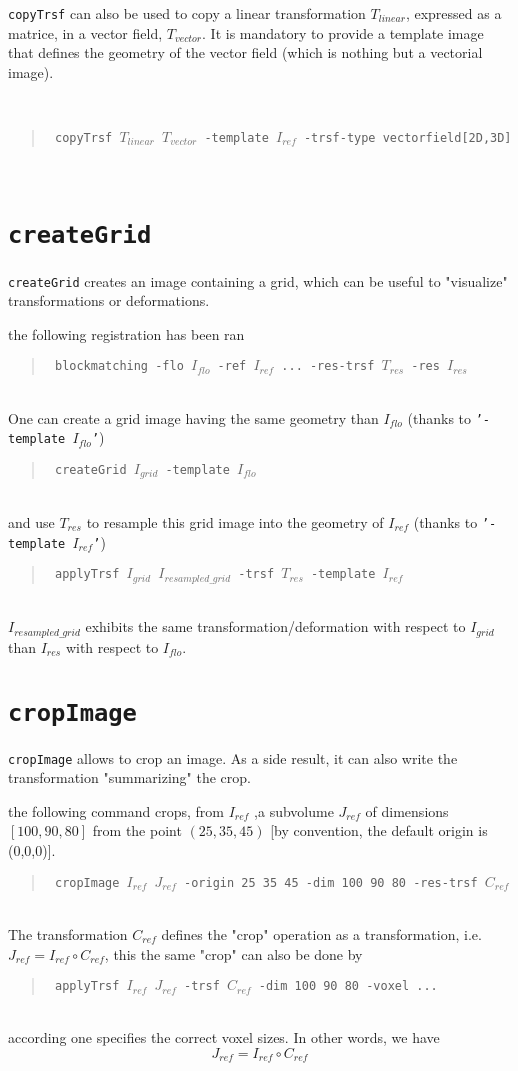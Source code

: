 \documentclass[10pt]{report}
\def\applyTrsf{\texttt{applyTrsf} }
\def\blockmatching{\texttt{blockmatching} }
\def\copyTrsf{\texttt{copyTrsf} }
\def\createGrid{\texttt{createGrid} }
\def\cropImage{\texttt{cropImage} }
\newcommand{\option}[1]{{\texttt{'#1'}}}
\newenvironment{code}[1]{\mbox{}\\[1ex]\hspace*{-#1cm}\begin{minipage}{150mm}\begin{quote}\tt}{\end{quote}\end{minipage}\mbox{}\\[1ex]}
\begin{document}
\copyTrsf can also be used to copy a linear transformation $T_{linear}$, expressed as a matrice, in a vector field, $T_{vector}$. It is mandatory to provide a template image that defines the geometry of the vector field (which is nothing but a vectorial image).

\begin{code}{0.8}
\% \copyTrsf $T_{linear}$ $T_{vector}$  -template $I_{ref}$ -trsf-type vectorfield[2D,3D]
\end{code}






\section{\createGrid}

\createGrid creates an image containing a grid, which can be useful to "visualize" transformations or deformations.


 the following registration has been ran
\begin{code}{1}
\% \blockmatching -flo $I_{flo}$ -ref $I_{ref}$ ... -res-trsf $T_{res}$ -res $I_{res}$
\end{code}
One can create a grid image having the same geometry than $I_{flo}$ (thanks to \option{-template $I_{flo}$})
\begin{code}{1}
\% \createGrid $I_{grid}$ -template $I_{flo}$ 
\end{code}
and use $T_{res}$ to resample this grid image into the geometry of $I_{ref}$ (thanks to \option{-template $I_{ref}$})
\begin{code}{1}
\% \applyTrsf $I_{grid}$ $I_{resampled\_grid}$ -trsf $T_{res}$ -template $I_{ref}$ 
\end{code}
$I_{resampled\_grid}$ exhibits the same transformation/deformation with respect to $I_{grid}$ than 
$I_{res}$ with respect to $I_{flo}$.





\section{\cropImage}

\cropImage allows to crop an image. As a side result, it can also write the transformation "summarizing" the crop.

the following command crops, from $I_{ref}$ ,a subvolume $J_{ref}$ of dimensions $[100,90,80]$ from the point $(25, 35, 45)$ [by convention, the default origin is (0,0,0)].
\begin{code}{0.8}
\% \cropImage $I_{ref}$ $J_{ref}$ -origin 25 35 45 -dim 100 90 80 -res-trsf $C_{ref}$
\end{code}
The transformation $C_{ref}$ defines the "crop" operation as a transformation,
i.e. $J_{ref} = I_{ref} \circ C_{ref}$, this the same "crop" can also be done by 
\begin{code}{0.8}
\% \applyTrsf $I_{ref}$ $J_{ref}$ -trsf $C_{ref}$ -dim 100 90 80 -voxel ...
\end{code}
according one specifies the correct voxel sizes. In other words, we have 
$$ J_{ref} = I_{ref} \circ C_{ref}$$
\end{document}
